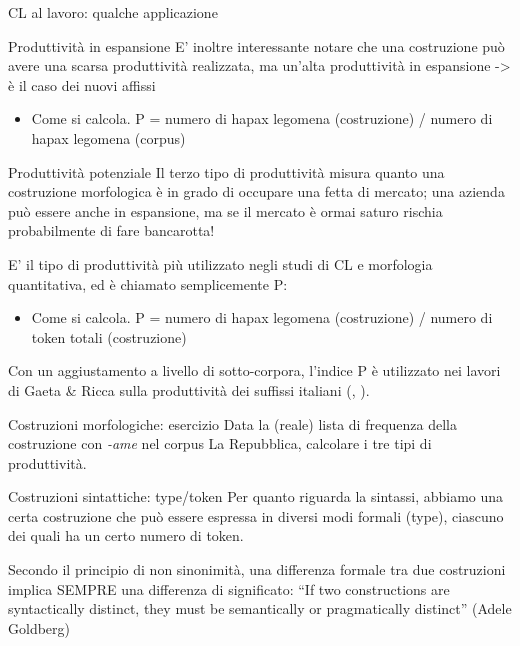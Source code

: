 \documentclass[pdf]{prosper}
\begin{document}
\begin{tsectionandpart}{CL al lavoro: qualche applicazione}
\begin{slide}{Produttività in espansione}
E' inoltre interessante notare che una costruzione può avere una scarsa produttività realizzata, ma un'alta produttività in espansione -> è il caso dei nuovi affissi

	\begin{itemize}
		\item Come si calcola. P = numero di hapax legomena (costruzione) / numero di hapax legomena (corpus)
	\end{itemize}

\end{slide}

\begin{slide}{Produttività potenziale}
Il terzo tipo di produttività misura quanto una costruzione morfologica è in grado di occupare una fetta di mercato; una azienda può essere anche in espansione, ma se il mercato è ormai saturo rischia probabilmente di fare bancarotta!

E' il tipo di produttività più utilizzato negli studi di CL e morfologia quantitativa, ed è chiamato semplicemente P:

\begin{itemize}
\item Come si calcola. P = numero di hapax legomena (costruzione) / numero di token totali (costruzione)
\end{itemize}

Con un aggiustamento a livello di sotto-corpora, l'indice P è utilizzato nei lavori di Gaeta \& Ricca sulla produttività dei suffissi italiani (\citealt{GaetaRicca2003}, \citealt{GaetaRicca2006}).
\end{slide}

\begin{slide}{Costruzioni morfologiche: esercizio}
Data la (reale) lista di frequenza della costruzione con {\it -ame} nel corpus La Repubblica, calcolare i tre tipi di produttività.

\end{slide}

\begin{slide}{Costruzioni sintattiche: type/token}
Per quanto riguarda la sintassi, abbiamo una certa costruzione che può essere espressa in diversi modi formali (type), ciascuno dei quali ha un certo numero di token.

Secondo il principio di non sinonimità, una differenza formale tra due costruzioni implica SEMPRE una differenza di significato: ``If two constructions are syntactically distinct, they must be semantically or pragmatically distinct'' (Adele Goldberg)


\end{slide}
\end{tsectionandpart}
\end{document}
